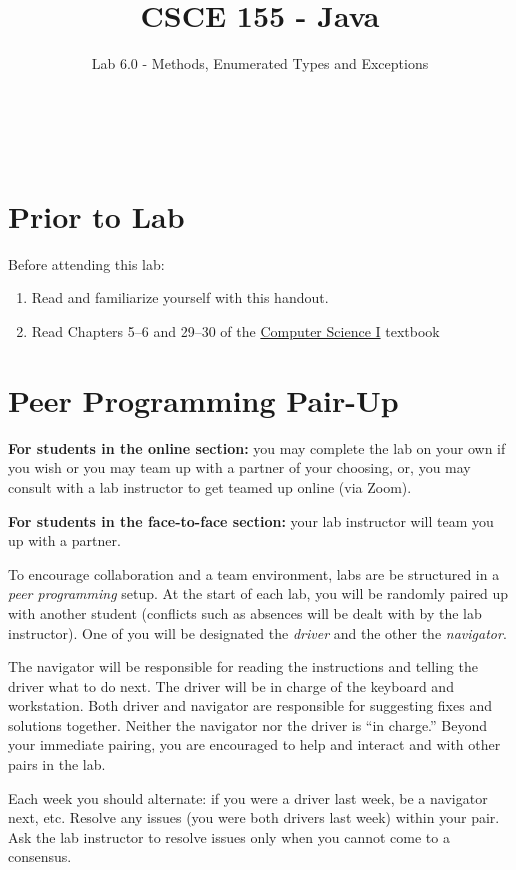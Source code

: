 \documentclass[12pt]{scrartcl}
\title{CSCE 155 - Java}
\subtitle{Lab 6.0 - Methods, Enumerated Types and Exceptions}
\author{~}
\date{~}
\begin{document}
\maketitle

\section*{Prior to Lab}

Before attending this lab:
\begin{enumerate}
  \item Read and familiarize yourself with this handout.
  \item Read Chapters 5--6 and 29--30 of the \href{http://cse.unl.edu/~cbourke/ComputerScienceOne.pdf}{Computer Science I} textbook
\end{enumerate}

\section*{Peer Programming Pair-Up}

\textbf{For students in the online section:} you may complete
the lab on your own if you wish or you may team up with a partner
of your choosing, or, you may consult with a lab instructor to get
teamed up online (via Zoom).

\textbf{For students in the face-to-face section:} your
lab instructor will team you up with a partner.  

To encourage collaboration and a team environment, labs are be
structured in a \emph{peer programming} setup.  At the start of
each lab, you will be randomly paired up with another student 
(conflicts such as absences will be dealt with by the lab instructor).
One of you will be designated the \emph{driver} and the other
the \emph{navigator}.  

The navigator will be responsible for reading the instructions and
telling the driver what to do next.  The driver will be in charge of the
keyboard and workstation.  Both driver and navigator are responsible
for suggesting fixes and solutions together.  Neither the navigator
nor the driver is ``in charge.''  Beyond your immediate pairing, you
are encouraged to help and interact and with other pairs in the lab.

Each week you should alternate: if you were a driver last week, 
be a navigator next, etc.  Resolve any issues (you were both drivers
last week) within your pair.  Ask the lab instructor to resolve issues
only when you cannot come to a consensus.  
\end{document}
